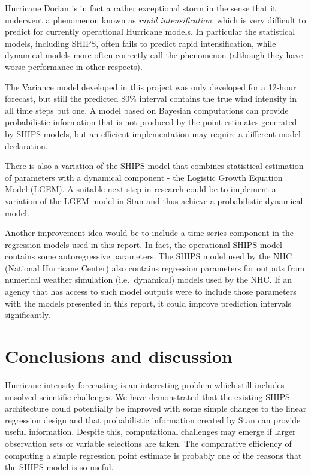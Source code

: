 \documentclass[
]{article}
\begin{document}
Hurricane Dorian is in fact a rather exceptional storm in the sense that
it underwent a phenomenon known as \emph{rapid intensification}, which
is very difficult to predict for currently operational Hurricane models.
In particular the statistical models, including SHIPS, often fails to
predict rapid intensification, while dynamical models more often
correctly call the phenomenon (although they have worse performance in
other respects).

The Variance model developed in this project was only developed for a
12-hour forecast, but still the predicted 80\% interval contains the
true wind intensity in all time steps but one. A model based on Bayesian
computations can provide probabilistic information that is not produced
by the point estimates generated by SHIPS models, but an efficient
implementation may require a different model declaration.

There is also a variation of the SHIPS model that combines statistical
estimation of parameters with a dynamical component - the Logistic
Growth Equation Model (LGEM). A suitable next step in research could be
to implement a variation of the LGEM model in Stan and thus achieve a
probabilistic dynamical model.

Another improvement idea would be to include a time series component in
the regression models used in this report. In fact, the operational
SHIPS model contains some autoregressive parameters. The SHIPS model
used by the NHC (National Hurricane Center) also contains regression
parameters for outputs from numerical weather simulation
(i.e.~dynamical) models used by the NHC. If an agency that has access to
such model outputs were to include those parameters with the models
presented in this report, it could improve prediction intervals
significantly.

\newpage

\hypertarget{conclusions-and-discussion}{%
\section{Conclusions and discussion}\label{conclusions-and-discussion}}

Hurricane intensity forecasting is an interesting problem which still
includes unsolved scientific challenges. We have demonstrated that the
existing SHIPS architecture could potentially be improved with some
simple changes to the linear regression design and that probabilistic
information created by Stan can provide useful information. Despite
this, computational challenges may emerge if larger observation sets or
variable selections are taken. The comparative efficiency of computing a
simple regression point estimate is probably one of the reasons that the
SHIPS model is so useful.
\end{document}
